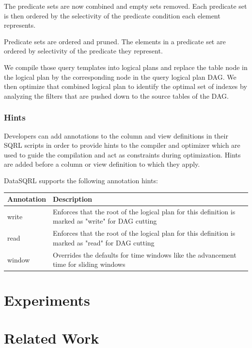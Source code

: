 \documentclass[	DIV=calc,%
							paper=letter,%
							fontsize=11pt,%
							twocolumn]{scrartcl}	 					%
\begin{document}
The predicate sets are now combined and empty sets removed. Each predicate set is then ordered by the selectivity of the predicate condition each element represents.


 Predicate sets are ordered and pruned. The elements in a predicate set are ordered by selectivity of the predicate they represent.

We compile those query templates into logical plans and replace the table node in the logical plan by the corresponding node in the query logical plan DAG. We then optimize that combined logical plan to identify the optimal set of indexes by analyzing the filters that are pushed down to the source tables of the DAG.

\subsubsection{Hints}

Developers can add annotations to the column and view definitions in their SQRL scripts in order to provide hints to the compiler and optimizer which are used to guide the compilation and act as constraints during optimization. Hints are added before a column or view definition to which they apply.

DataSQRL supports the following annotation hints:

\begin{tabular}{|p{}p{}|}
 \hline
 Annotation & Description \\
 \hline
write & Enforces that the root of the logical plan for this definition is marked as "write" for DAG cutting \\
read & Enforces that the root of the logical plan for this definition is marked as "read" for DAG cutting \\
window & Overrides the defaults for time windows like the advancement time for sliding windows \\
 \hline
\end{tabular}


\section{Experiments}
\label{sec:experiments}


\section{Related Work}
\label{sec:related}
\end{document}
